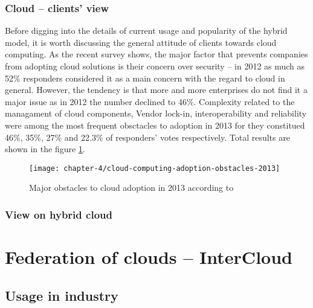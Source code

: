 \subsubsection*{Cloud -- clients' view}
Before digging into the details of current usage and popularity of the hybrid model, it is worth discussing the general attitude of clients towards cloud computing. As the recent survey \cite{RackspaceSurvey13} shows, the major factor that prevents companies from adopting cloud solutions is their concern over security -- in 2012 as much as 52\% responders considered it as a main concern with the regard to cloud in general. However, the tendency is that more and more enterprises do not find it a major issue as in 2012 the number declined to 46\%.
Complexity related to the managament of cloud components, Vendor lock-in, interoperability and reliability were among the most frequent obsctacles to adoption in 2013 for they constitued 46\%, 35\%, 27\% and 22.3\% of responders' votes respectively. Total results are shown in the figure \ref{ch4:cloud-computing-adoption-obstacles-2013}.
\begin{figure}[!ht]
  \begin{center}
    \texttt{[image: chapter-4/cloud-computing-adoption-obstacles-2013]}
  \end{center}
  \caption{Major obstacles to cloud adoption in 2013 according to \cite{RackspaceSurvey13}}
  \label{ch4:cloud-computing-adoption-obstacles-2013}
\end{figure}

\subsubsection*{View on hybrid cloud}

\section{Federation of clouds -- InterCloud}

\subsection{Usage in industry}

